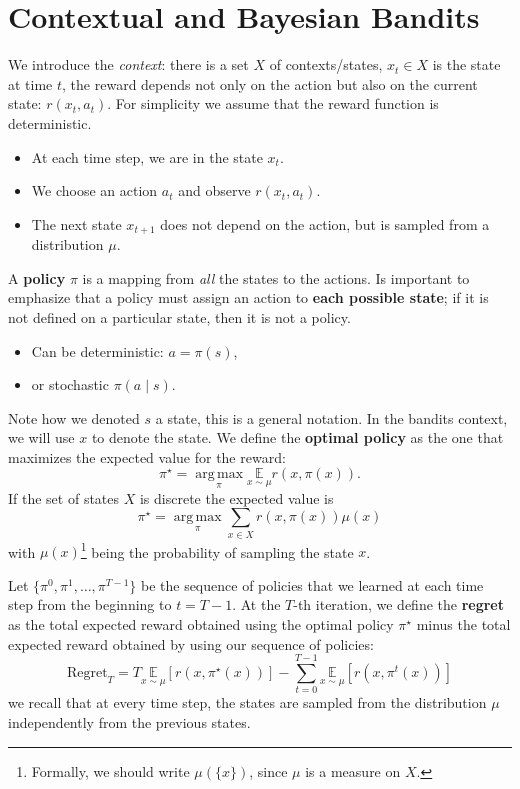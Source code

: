 \documentclass[10pt, a4paper]{report}
\begin{document}
\section{Contextual and Bayesian Bandits}
We introduce the \textit{context}: there is a set $X$ of contexts/states, $x_t\in X$ is the state at time $t$, the reward depends not only on the action but also on the current state: $r(x_t,a_t)$. For simplicity we assume that the reward function is deterministic.\begin{itemize}
    \item At each time step, we are in the state $x_t$.
    \item We choose an action $a_t$ and observe $r(x_t,a_t)$.
    \item The next state $x_{t+1}$ does not depend on the action, but is sampled from a distribution $\mu$.
\end{itemize}
A \textbf{policy} $\pi$ is a mapping from \textit{all} the states to the actions. Is important to emphasize that a policy must assign an action to \textbf{each possible state}; if it is not defined on a particular state, then it is not a policy.\begin{itemize}
    \item Can be deterministic: $a=\pi(s)$,
    \item or stochastic $\pi( a \mid s)$.
\end{itemize}
Note how we denoted $s$ a state, this is a general notation. In the bandits context, we will use $x$ to denote the state. We define the \textbf{optimal policy} as the one that maximizes the expected value for the reward:\begin{equation}
    \pi^\star=\operatorname*{arg\,max}_{\pi}\underset{x\sim\mu}{\mathbb E} r(x,\pi(x)).
\end{equation}
If the set of states $X$ is discrete the expected value is\begin{equation}
        \pi^\star=\operatorname*{arg\,max}_{\pi}\sum_{x\in X} r(x,\pi(x))\mu(x)
\end{equation}
with $\mu(x)$\footnote{
    Formally, we should write $\mu(\{x\})$, since $\mu$ is a measure on $X$.
} being the probability of sampling the state $x$. \bigskip 

Let $\{\pi^0,\pi^1,\dots,\pi^{T-1}\}$ be the sequence of policies that we learned at each time step from the beginning to $t=T-1$. At the $T$-th iteration, we define the \textbf{regret} as the total expected reward obtained using the optimal policy $\pi^\star$ minus the total expected reward obtained by using our sequence of policies:\begin{equation}
    \text{Regret}_T=T\underset{x\sim\mu}{\mathbb E}\left[
        r(x,\pi^\star(x))
    \right]- 
    \sum_{t=0}^{T-1}\underset{x\sim\mu}{\mathbb E}\left[
        r(x,\pi^t(x))
    \right]
\end{equation}
we recall that at every time step, the states are sampled from the distribution $\mu$ independently from the previous states.
\end{document}

